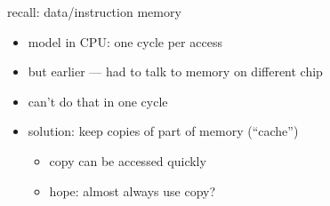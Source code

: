 \begin{frame}{recall: data/instruction memory}
    \begin{itemize}
    \item model in CPU: one cycle per access
    \vspace{.5cm}
    \item but earlier --- had to talk to memory on different chip
    \item can't do that in one cycle
    \vspace{.5cm}
    \item solution: keep copies of part of memory (``cache'')
        \begin{itemize}
        \item copy can be accessed quickly
        \item hope: almost always use copy?
        \end{itemize}
    \end{itemize}
\end{frame}

